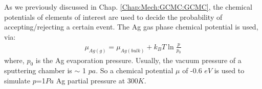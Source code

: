 As we previously discussed in Chap. \ref{Chap:Mech:GCMC:GCMC}, the chemical potentials of elements of interest are used to decide the probability of accepting/rejecting a certain event. The Ag gas phase chemical potential is used, via:
\begin{align}
 \mu_{Ag(g)} = \mu_{Ag(bulk)} + k_{B}T\ln{\frac{p}{p_0}}
 \label{Chap:Ag/ZnO:eq:mu_Ag}
\end{align}
where, $p_0$ is the Ag evaporation pressure. Usually, the vacuum pressure of a sputtering chamber is $\sim$ 1 $pa$. So a chemical potential $\mu$ of -0.6 $eV$ is used to simulate $p$=1$Pa$ Ag partial pressure at 300$K$.

\begingroup
\begin{figure}[!ht]
  \centering
  \label{Chap:Ag/ZnO:fig:3a}
  \label{Chap:Ag/ZnO:fig:3b}
  \\
  \label{Chap:Ag/ZnO:fig:3c}

\end{figure}
